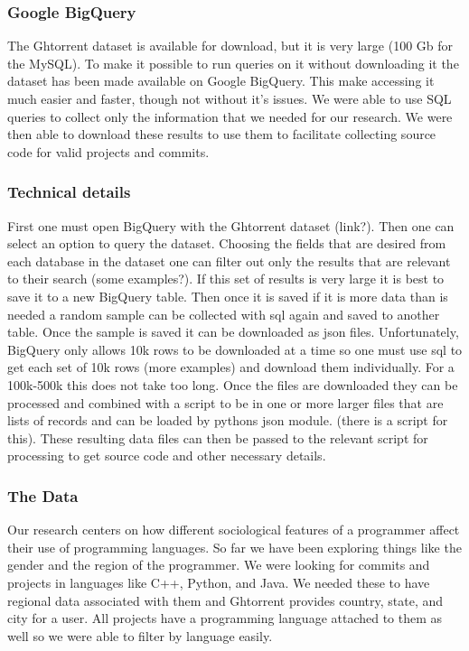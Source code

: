 \documentclass{article}
\begin{document}
\subsubsection{Google BigQuery}
The Ghtorrent dataset is available for download, but it is very large (100 Gb for the MySQL). To make it possible to run queries on it without downloading it the dataset has been made available on Google BigQuery. This make accessing it much easier and faster, though not without it's issues. We were able to use SQL queries to collect only the information that we needed for our research. We were then able to download these results to use them to facilitate collecting source code for valid projects and commits.

\subsubsection{Technical details}
First one must open BigQuery with the Ghtorrent dataset (link?). Then one can select an option to query the dataset. Choosing the fields that are desired from each database in the dataset one can filter out only the results that are relevant to their search (some examples?). If this set of results is very large it is best to save it to a new BigQuery table. Then once it is saved if it is more data than is needed a random sample can be collected with sql again and saved to another table. Once the sample is saved it can be downloaded as json files. Unfortunately, BigQuery only allows 10k rows to be downloaded at a time so one must use sql to get each set of 10k rows (more examples) and download them individually. For a 100k-500k this does not take too long. Once the files are downloaded they can be processed and combined with a script to be in one or more larger files that are lists of records and can be loaded by pythons json module. (there is a script for this). These resulting data files can then be passed to the relevant script for processing to get source code and other necessary details.

\subsubsection{The Data}
Our research centers on how different sociological features of a programmer affect their use of programming languages. So far we have been exploring things like the gender and the region of the programmer. We were looking for commits and projects in languages like C++, Python, and Java. We needed these to have regional data associated with them and Ghtorrent provides country, state, and city for a user. All projects have a programming language attached to them as well so we were able to filter by language easily.
\end{document}
